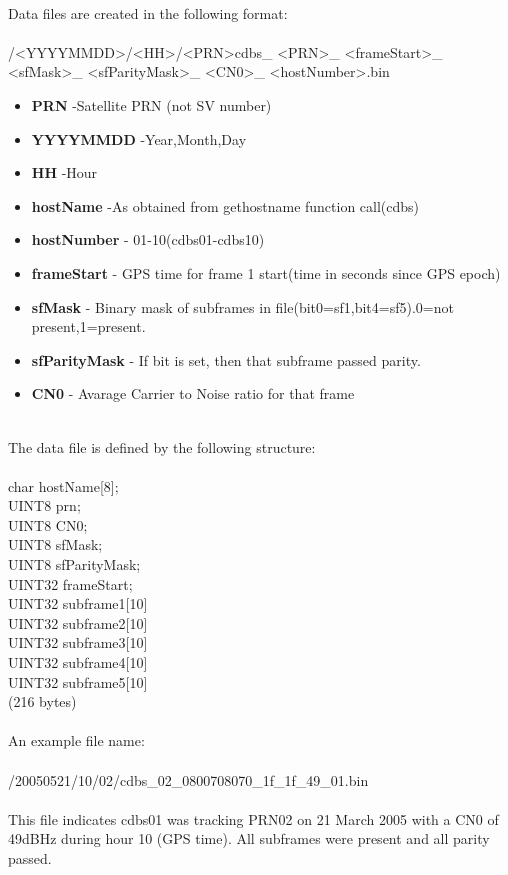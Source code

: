 \documentclass[12pt,letterpaper,oneside]{report}
\begin{document}
\\
Data files are created in the following format:\\\\
/\textless YYYYMMDD\textgreater /\textless HH\textgreater /\textless PRN\textgreater cdbs\_ \textless PRN\textgreater\_ \textless frameStart\textgreater\_ \textless sfMask\textgreater\_ \textless sfParityMask\textgreater\_ \textless CN0\textgreater\_ \textless hostNumber\textgreater .bin\\
\begin{itemize}
\item {\bf PRN} -Satellite PRN (not SV number)
\item {\bf YYYYMMDD} -Year,Month,Day
\item {\bf HH} -Hour
\item {\bf hostName} -As obtained from gethostname function call(cdbs)
\item {\bf hostNumber} - 01-10(cdbs01-cdbs10)
\item {\bf frameStart} - GPS time for frame 1 start(time in seconds since GPS epoch)
\item {\bf sfMask} - Binary mask of subframes in file(bit0=sf1,bit4=sf5).0=not present,1=present.
\item {\bf sfParityMask} - If bit is set, then that subframe passed parity. 
\item {\bf CN0} - Avarage Carrier to Noise ratio for that frame
\end{itemize}\\
The data file is defined by the following structure:\\\\
char hostName[8];\\
UINT8 prn;\\
UINT8 CN0;\\
UINT8 sfMask;\\
UINT8 sfParityMask;\\
UINT32 frameStart;\\
UINT32 subframe1[10]\\
UINT32 subframe2[10]\\
UINT32 subframe3[10]\\
UINT32 subframe4[10]\\
UINT32 subframe5[10]\\
(216 bytes)\\\\
An example file name:\\\\
/20050521/10/02/cdbs\_02\_0800708070\_1f\_1f\_49\_01.bin\\\\
This file indicates cdbs01 was tracking PRN02 on 21 March 2005 with a CN0 of 49dBHz during hour 10 (GPS time). All subframes were present and all parity passed.
\newpage
\end{document}
